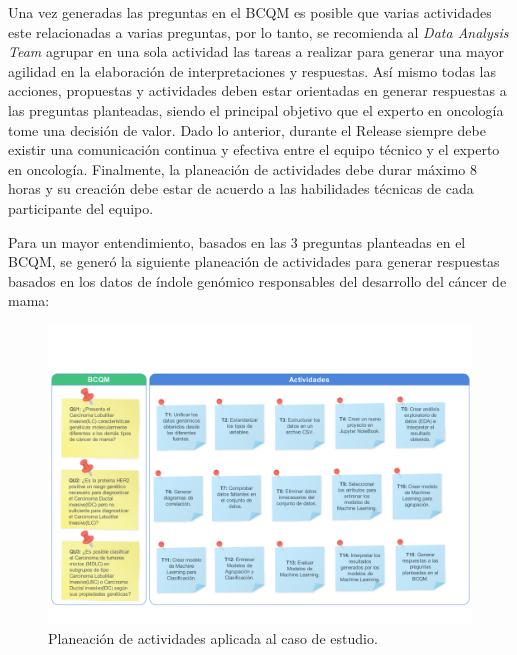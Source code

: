 Una vez generadas las preguntas en el BCQM es posible que varias actividades este relacionadas a varias preguntas, por lo tanto, se recomienda al \textit{Data Analysis Team} agrupar en una sola actividad las tareas a realizar para generar una mayor agilidad en la elaboración de interpretaciones y respuestas. Así mismo todas las acciones, propuestas y actividades deben estar orientadas en generar respuestas a las preguntas planteadas, siendo el principal objetivo que el experto en oncología tome una decisión de valor. Dado lo anterior, durante el Release siempre debe existir una comunicación continua y efectiva entre el equipo técnico y el experto en oncología. Finalmente, la planeación de actividades debe durar máximo 8 horas y su creación debe estar de acuerdo a las habilidades técnicas de cada participante del equipo.

Para un mayor entendimiento, basados en las 3 preguntas planteadas en el BCQM, se generó la siguiente planeación de actividades para generar respuestas basados en los datos de índole genómico responsables del desarrollo del cáncer de mama:
\begin{figure}[!htb]
	\centering
	\includegraphics[width=
	\linewidth]{IMAGENES/Planning_TCGA}
	\caption{Planeación de actividades aplicada al caso de estudio\cite{planningDSM2023}.}
	\label{Activity_Planning_TCGA}
\end{figure}
